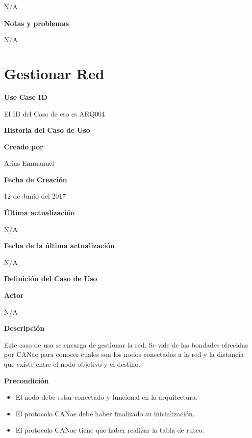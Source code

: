 N/A

\large\textbf{Notas y problemas}
\vspace{3mm}

N/A



\section{Gestionar Red}\label{uc:GestionarRed}

\large\textbf{Use Case ID}
\vspace{3mm}

El ID del Caso de eso es ARQ004

\Large\textbf{Historia del Caso de Uso}
\vspace{3mm}

\large\textbf{Creado por}
\vspace{3mm}

Arias Emmanuel

\large\textbf{Fecha de Creación}
\vspace{3mm}

12 de Junio del 2017

\large\textbf{Última actualización}
\vspace{3mm}

N/A

\large\textbf{Fecha de la última actualización}
\vspace{3mm}

N/A

\Large\textbf{Definición del Caso de Uso}
\vspace{3mm}

\large\textbf{Actor}
\vspace{3mm}

N/A

\large\textbf{Descripción}
\vspace{3mm}

Este caso de uso se encarga de gestionar la red. Se vale de las
bondades ofrecidas por CANae para conocer cuales son los nodos
conectados a la red y la distancia que existe entre el nodo
objetivo y el destino. 

\large\textbf{Precondición}
\begin{itemize}
\item El nodo debe estar conectado y funcional en la arquitectura.
\item El protocolo CANae debe haber finalizado su inicialización.
\item El protocolo CANae tiene que haber realizar la tabla de ruteo.
\end{itemize}

